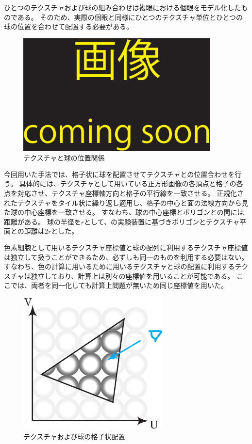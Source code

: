 ひとつのテクスチャおよび球の組み合わせは複眼における個眼をモデル化したものである。
そのため、実際の個眼と同様にひとつのテクスチャ単位とひとつの球の位置を合わせて配置する必要がある。

\begin{figure}[h]
  \centering
  \includegraphics[width=4.0in]{./img/TEMP}
  \caption{テクスチャと球の位置関係}
  \label{FTexturesphereposition}
\end{figure}

\noindent
今回用いた手法では、格子状に球を配置させてテクスチャとの位置合わせを行う。
具体的には、テクスチャとして用いている正方形画像の各頂点と格子の各点を対応させ、テクスチャ座標軸方向と格子の平行線を一致させる。
正規化されたテクスチャをタイル状に繰り返し適用し、格子の中心と面の法線方向から見た球の中心座標を一致させる。
すなわち、球の中心座標とポリゴンとの間には距離がある。
球の半径を$r$として、の実験装置に基づきポリゴンとテクスチャ平面との距離は$2r$とした\figref{}。

色素細胞として用いるテクスチャ座標値と球の配列に利用するテクスチャ座標値は独立して扱うことができるため、必ずしも同一のものを利用する必要はない。
すなわち、色の計算に用いるために用いるテクスチャと球の配置に利用するテクスチャは独立しており、計算上は別々の座標値を用いることが可能である。
ここでは、両者を同一化しても計算上問題が無いため同じ座標値を用いた。

\begin{figure}[h]
  \centering
  \includegraphics[width=3.0in]{./img/sphere_position.eps}
  \caption{テクスチャおよび球の格子状配置}
  \label{FGrid}
\end{figure}

